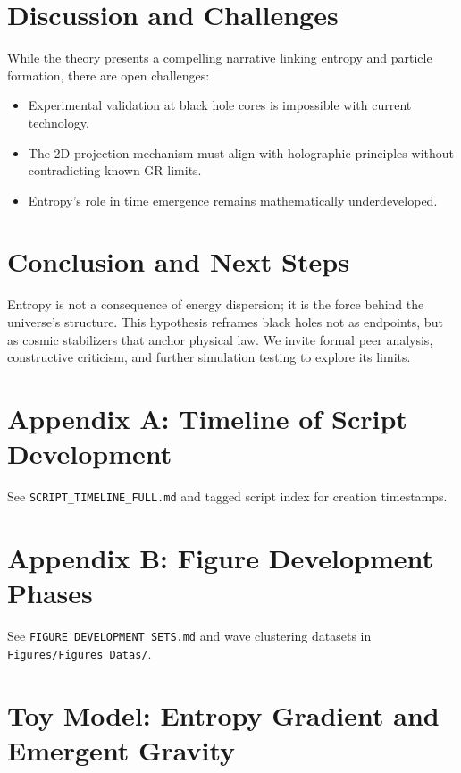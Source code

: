\documentclass[12pt]{article}
\begin{document}
\section{Discussion and Challenges}

While the theory presents a compelling narrative linking entropy and particle formation, there are open challenges:

\begin{itemize}
    \item Experimental validation at black hole cores is impossible with current technology.
    \item The 2D projection mechanism must align with holographic principles without contradicting known GR limits.
    \item Entropy's role in time emergence remains mathematically underdeveloped.
\end{itemize}

\section{Conclusion and Next Steps}

Entropy is not a consequence of energy dispersion; it is the force behind the universe's structure. This hypothesis reframes black holes not as endpoints, but as cosmic stabilizers that anchor physical law. We invite formal peer analysis, constructive criticism, and further simulation testing to explore its limits.

\appendix

\section{Appendix A: Timeline of Script Development}

See \texttt{SCRIPT\_TIMELINE\_FULL.md} and tagged script index for creation timestamps.

\section{Appendix B: Figure Development Phases}

See \texttt{FIGURE\_DEVELOPMENT\_SETS.md} and wave clustering datasets in \texttt{Figures/Figures~Datas/}.

\tableofcontents

\section{Toy Model: Entropy Gradient and Emergent Gravity}
\end{document}
